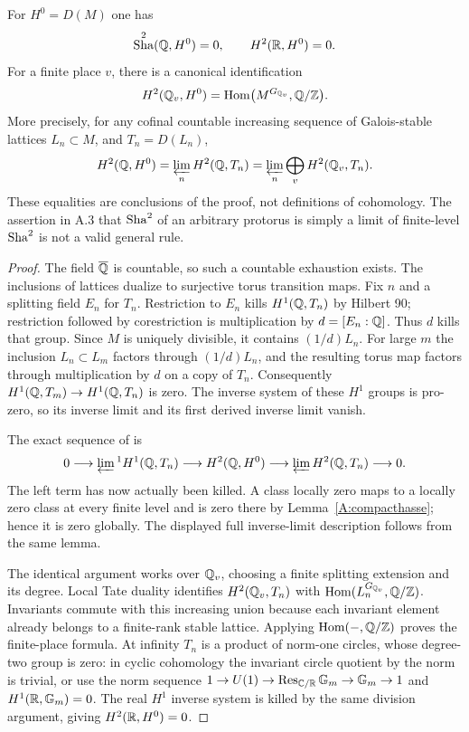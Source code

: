 \begin{theorem}
\label{A:hasse}
For $H^0=D(M)$ one has
\[
 \mathop{\mathrm{Sha}}^2(\mathbb Q,H^0)=0,\qquad H^2(\mathbb R,H^0)=0.
\]
For a finite place $v$, there is a canonical identification
\[
 H^2(\mathbb Q_v,H^0)=\operatorname{Hom}\bigl(M^{G_{\mathbb Q_v}},\mathbb Q/\mathbb Z\bigr).
\]
More precisely, for any cofinal countable increasing sequence of
Galois-stable lattices $L_n\subset M$, and $T_n=D(L_n)$,
\[
 H^2(\mathbb Q,H^0)=\varprojlim_n H^2(\mathbb Q,T_n)
            =\varprojlim_n\bigoplus_v H^2(\mathbb Q_v,T_n).
\]
These equalities are conclusions of the proof, not definitions of
cohomology. The assertion in A.3 that $\mathop{\mathrm{Sha}}^2$ of an arbitrary
protorus is simply a limit of finite-level $\mathop{\mathrm{Sha}}^2$ is not a
valid general rule.
\end{theorem}
\begin{proof}
The field $\overline{\mathbb Q}$ is countable, so such a countable exhaustion
exists. The inclusions of lattices dualize to surjective torus
transition maps. Fix $n$ and a splitting field $E_n$ for $T_n$.
Restriction to $E_n$ kills $H^1(\mathbb Q,T_n)$ by Hilbert 90; restriction
followed by corestriction is multiplication by $d=[E_n:\mathbb Q]$.
Thus $d$ kills that group. Since $M$ is uniquely divisible, it
contains $(1/d)L_n$. For large $m$ the inclusion $L_n\subset L_m$
factors through $(1/d)L_n$, and the resulting torus map factors
through multiplication by $d$ on a copy of $T_n$. Consequently
$H^1(\mathbb Q,T_m)\to H^1(\mathbb Q,T_n)$ is zero. The inverse system of
these $H^1$ groups is pro-zero, so its inverse limit and its first
derived inverse limit vanish.

The exact sequence of \citet[Proposition 2.8]{AMilne2003} is
\[
 0\longrightarrow\varprojlim{}^1 H^1(\mathbb Q,T_n)
 \longrightarrow H^2(\mathbb Q,H^0)
 \longrightarrow\varprojlim H^2(\mathbb Q,T_n)\longrightarrow0.
\]
The left term has now actually been killed. A class locally zero
maps to a locally zero class at every finite level and is zero
there by Lemma~\ref{A:compacthasse}; hence it is zero globally.
The displayed full inverse-limit description follows from the same
lemma.

The identical argument works over $\mathbb Q_v$, choosing a finite
splitting extension and its degree. Local Tate duality
\citep[Theorem I.2.4]{AMilneADT} identifies
$H^2(\mathbb Q_v,T_n)$ with $\operatorname{Hom}(L_n^{G_{\mathbb Q_v}},\mathbb Q/\mathbb Z)$.
Invariants commute with this increasing union because each invariant
element already belongs to a finite-rank stable lattice. Applying
$\operatorname{Hom}(-,\mathbb Q/\mathbb Z)$ proves the finite-place formula. At infinity
$T_n$ is a product of norm-one circles, whose degree-two group is
zero: in cyclic cohomology the invariant circle quotient by the
norm is trivial, or use the norm sequence
$1\to U(1)\to\operatorname{Res}_{\mathbb C/\mathbb R}{\mathbb G_m}\to{\mathbb G_m}\to1$
and $H^1(\mathbb R,{\mathbb G_m})=0$. The real $H^1$ inverse system is killed
by the same division argument, giving $H^2(\mathbb R,H^0)=0$.
\end{proof}

